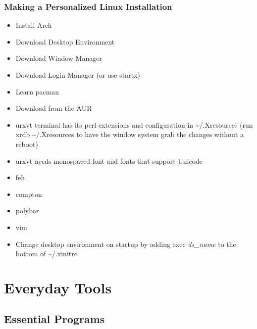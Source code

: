 \subsubsection{Making a Personalized Linux Installation}


\begin{itemize}
	\item Install Arch
	\item Download Desktop Environment
	\item Download Window Manager
	\item Download Login Manager (or use startx)
	\item Learn pacman
	\item Download from the AUR
	\item urxvt terminal has its perl extensions and configuration in \textasciitilde/.Xresources (run xrdb \textasciitilde/.Xresources to have the window system grab the changes without a reboot)
	\item urxvt needs monospaced font and fonts that support Unicode
	\item feh
	\item compton
	\item polybar
	\item vim
	\item Change desktop environment on startup by adding exec \textit{ds\_name} to the bottom of \textasciitilde/.xinitrc
\end{itemize}

\toclineskip
\section{Everyday Tools}


\subsection{Essential Programs}




